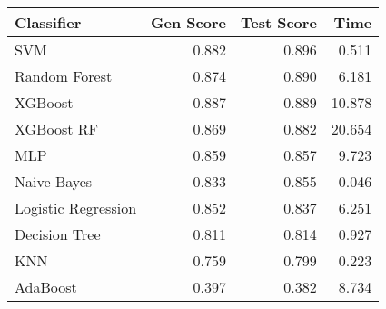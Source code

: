 \begin{tabular}{lrrr}
\toprule
Classifier & Gen Score & Test Score & Time \\
\midrule
SVM & 0.882 & 0.896 & 0.511 \\
Random Forest & 0.874 & 0.890 & 6.181 \\
XGBoost & 0.887 & 0.889 & 10.878 \\
XGBoost RF & 0.869 & 0.882 & 20.654 \\
MLP & 0.859 & 0.857 & 9.723 \\
Naive Bayes & 0.833 & 0.855 & 0.046 \\
Logistic Regression & 0.852 & 0.837 & 6.251 \\
Decision Tree & 0.811 & 0.814 & 0.927 \\
KNN & 0.759 & 0.799 & 0.223 \\
AdaBoost & 0.397 & 0.382 & 8.734 \\
\bottomrule
\end{tabular}
